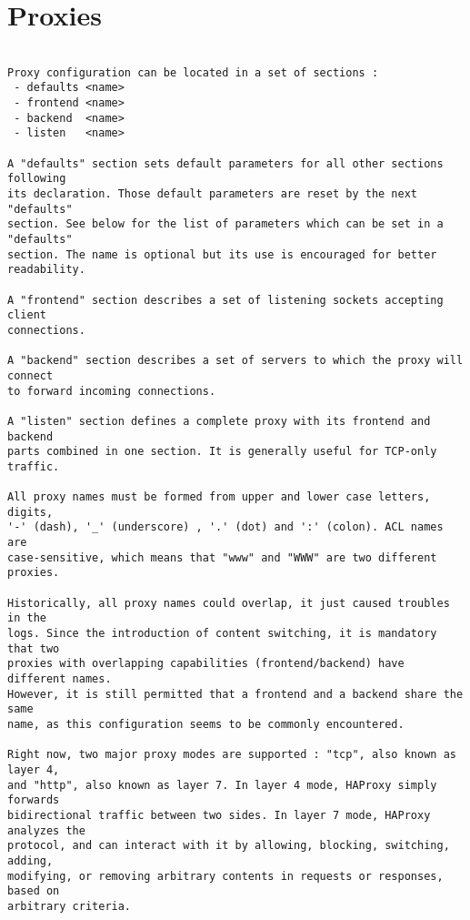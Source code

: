 
\chapter{Proxies}

\begin{verbatim}

Proxy configuration can be located in a set of sections :
 - defaults <name>
 - frontend <name>
 - backend  <name>
 - listen   <name>

A "defaults" section sets default parameters for all other sections following
its declaration. Those default parameters are reset by the next "defaults"
section. See below for the list of parameters which can be set in a "defaults"
section. The name is optional but its use is encouraged for better readability.

A "frontend" section describes a set of listening sockets accepting client
connections.

A "backend" section describes a set of servers to which the proxy will connect
to forward incoming connections.

A "listen" section defines a complete proxy with its frontend and backend
parts combined in one section. It is generally useful for TCP-only traffic.

All proxy names must be formed from upper and lower case letters, digits,
'-' (dash), '_' (underscore) , '.' (dot) and ':' (colon). ACL names are
case-sensitive, which means that "www" and "WWW" are two different proxies.

Historically, all proxy names could overlap, it just caused troubles in the
logs. Since the introduction of content switching, it is mandatory that two
proxies with overlapping capabilities (frontend/backend) have different names.
However, it is still permitted that a frontend and a backend share the same
name, as this configuration seems to be commonly encountered.

Right now, two major proxy modes are supported : "tcp", also known as layer 4,
and "http", also known as layer 7. In layer 4 mode, HAProxy simply forwards
bidirectional traffic between two sides. In layer 7 mode, HAProxy analyzes the
protocol, and can interact with it by allowing, blocking, switching, adding,
modifying, or removing arbitrary contents in requests or responses, based on
arbitrary criteria.


\end{verbatim}
